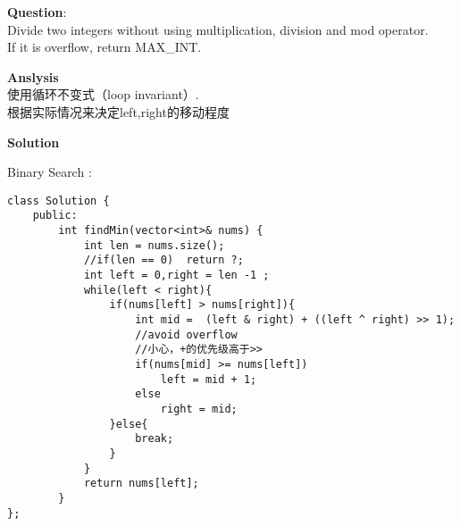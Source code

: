     
\begin{description}
    \item{\textbf{Question}}:\\%
		Divide two integers without using multiplication, division and mod operator.\\
		If it is overflow, return MAX\_INT.\\

    \item{\textbf{Anslysis}}\\
		使用循环不变式（loop invariant）.\\
		根据实际情况来决定left,right的移动程度\\

    \item{\textbf{Solution}}\\
	\item{Binary Search} : \\
		\begin{lstlisting}
class Solution {
	public:
		int findMin(vector<int>& nums) {
			int len = nums.size();
			//if(len == 0)	return ?;
			int left = 0,right = len -1 ;
			while(left < right){
				if(nums[left] > nums[right]){
					int mid =  (left & right) + ((left ^ right) >> 1);
					//avoid overflow
					//小心，+的优先级高于>>
					if(nums[mid] >= nums[left])
						left = mid + 1;
					else
						right = mid;
				}else{
					break;
				}
			}
			return nums[left];
		}
};
		\end{lstlisting}
\end{description}

